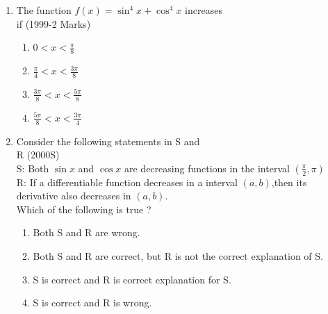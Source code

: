 \documentclass[journal,12pt,twocolumn]{IEEEtran}
\theoremstyle{remark}
\begin{document}
\begin{enumerate}
\item The function $f(x)= \sin^4x+\cos^4x$ increases \\
if \hfill (1999-2 Marks)
\begin{enumerate}
    \item $0<x<\displaystyle\frac{\pi}{8}$\\
    \item $\displaystyle\frac{\pi}{4}<x<\displaystyle\frac{3\pi}{8}$\\
    \item $\displaystyle\frac{3\pi}{8} <x<\displaystyle\frac{5\pi}{8}$\\
    \item $\displaystyle\frac{5\pi}{8}<x<\displaystyle\frac{3\pi}{4}$\\
\end{enumerate}
\item Consider the following statements in S and \\
R \hfill {(2000S)}\\
S: Both $\sin x$ and $\cos x$ are decreasing functions in the interval $\left(\displaystyle\frac{\pi}{2},\pi\right)$\\
R: If a differentiable function decreases in a interval $(a,b)$,then its derivative also decreases in $(a,b)$.\\
Which of the following is true ?
\begin{enumerate}
    \item Both S and R are wrong.
    \item Both S and R are correct, but R is not the correct explanation of S.
    \item S is correct and R is correct explanation for S.
    \item S is correct and R is wrong.\\
\end{enumerate}


\end{enumerate}
\end{document}
